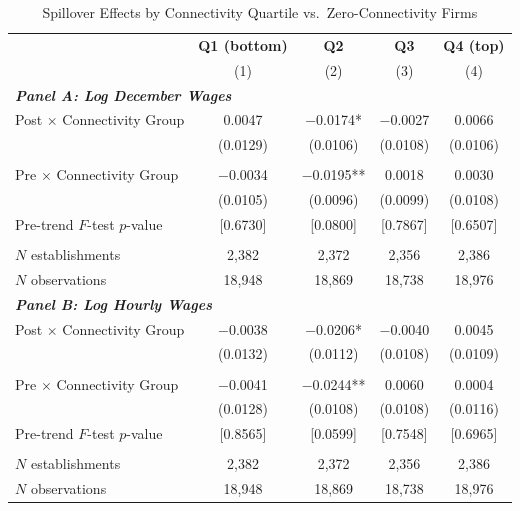 \begin{table}[H]
\centering
\caption{Spillover Effects by Connectivity Quartile vs.\ Zero-Connectivity Firms}
\label{tab:conn_margins_quartiles_vs_zero}
\scriptsize
\begin{tabular}{lcccc}
\toprule\toprule
 & \textbf{Q1 (bottom)} & \textbf{Q2} & \textbf{Q3} & \textbf{Q4 (top)} \\
 & (1) & (2) & (3) & (4) \\
\midrule
\multicolumn{5}{l}{\textit{\textbf{Panel A: Log December Wages}}} \\
\midrule
Post $\times$ Connectivity Group & 0.0047 & $-$0.0174* & $-$0.0027 & 0.0066 \\
  & (0.0129) & (0.0106) & (0.0108) & (0.0106) \\
  & & & & \\
Pre $\times$ Connectivity Group & $-$0.0034 & $-$0.0195** & 0.0018 & 0.0030 \\
  & (0.0105) & (0.0096) & (0.0099) & (0.0108) \\
Pre-trend $F$-test $p$-value & [0.6730] & [0.0800] & [0.7867] & [0.6507] \\
  & & & & \\
$N$ establishments & 2,382 & 2,372 & 2,356 & 2,386 \\
$N$ observations & 18,948 & 18,869 & 18,738 & 18,976 \\
\midrule
\multicolumn{5}{l}{\textit{\textbf{Panel B: Log Hourly Wages}}} \\
\midrule
Post $\times$ Connectivity Group & $-$0.0038 & $-$0.0206* & $-$0.0040 & 0.0045 \\
  & (0.0132) & (0.0112) & (0.0108) & (0.0109) \\
  & & & & \\
Pre $\times$ Connectivity Group & $-$0.0041 & $-$0.0244** & 0.0060 & 0.0004 \\
  & (0.0128) & (0.0108) & (0.0108) & (0.0116) \\
Pre-trend $F$-test $p$-value & [0.8565] & [0.0599] & [0.7548] & [0.6965] \\
  & & & & \\
$N$ establishments & 2,382 & 2,372 & 2,356 & 2,386 \\
$N$ observations & 18,948 & 18,869 & 18,738 & 18,976 \\
\bottomrule\bottomrule
\end{tabular}
\begin{minipage}{\linewidth}
\footnotesize\vspace{4pt}

\end{minipage}
\end{table}
